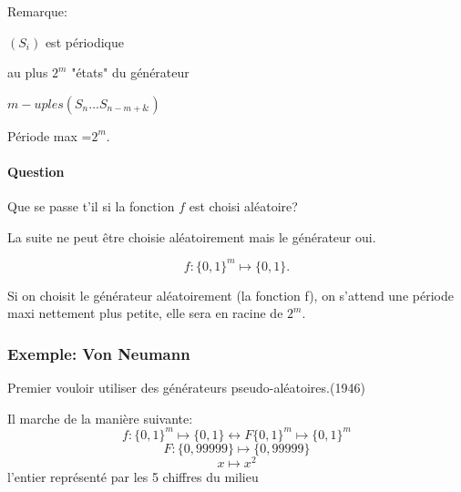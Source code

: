 \documentclass[12pt,a4paper]{article}
\begin{document}
	Remarque:
	
	$(S_i)$ est périodique
	
	au plus $2^m$ "états" du générateur
	
	$m-uples (S_n ...S_{n-m+\&})$
	
	Période max =$2^m$.
	
\paragraph{Question}
Que se passe t'il si la fonction $f$ est choisi aléatoire?

La suite ne peut être choisie aléatoirement mais le générateur oui.

\begin{displaymath}
f: \{0,1\}^m \mapsto \{0,1\}.
\end{displaymath}

Si on choisit le générateur aléatoirement (la fonction f), on s'attend  une période maxi nettement plus petite, elle sera en racine de $2^m$.

\subsubsection{Exemple: Von Neumann}
	Premier  vouloir utiliser des générateurs pseudo-aléatoires.(1946)
	
	Il marche de la manière suivante:
	\begin{displaymath}
	f:\{0,1\}^m \mapsto \{0,1\} \leftrightarrow F\{0,1\}^m \mapsto \{0,1\}^m
	\end{displaymath}
	\begin{displaymath}
	F:\{0, 99999\} \mapsto \{0,99999\}
	\end{displaymath}
	\begin{displaymath}
	x \mapsto x^2
	\end{displaymath}
	l'entier représenté par les 5 chiffres du milieu
	
\end{document}
